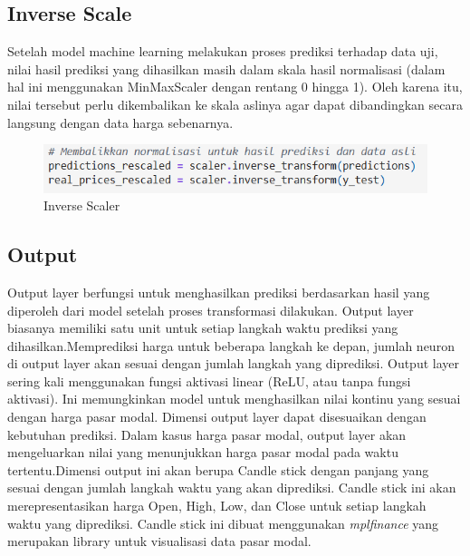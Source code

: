 



\subsection{Inverse Scale}
Setelah model machine learning melakukan proses prediksi terhadap data uji, nilai hasil prediksi yang dihasilkan masih dalam skala hasil normalisasi (dalam hal ini menggunakan MinMaxScaler dengan rentang 0 hingga 1). Oleh karena itu, nilai tersebut perlu dikembalikan ke skala aslinya agar dapat dibandingkan secara langsung dengan data harga sebenarnya.

\begin{figure} [H] \centering
    \includegraphics[scale=1.0]{gambar/inverse scaler.png} 
    \caption{Inverse Scaler}
    \label{fig:InverseScaler}
\end{figure}


\subsection{Output}
Output layer berfungsi untuk menghasilkan prediksi berdasarkan hasil yang diperoleh dari model setelah proses transformasi dilakukan. Output layer biasanya memiliki satu unit untuk setiap langkah waktu prediksi yang dihasilkan.Memprediksi harga untuk beberapa langkah ke depan, jumlah neuron di output layer akan sesuai dengan jumlah langkah yang diprediksi. Output layer sering kali menggunakan fungsi aktivasi linear (ReLU, atau tanpa fungsi aktivasi). Ini memungkinkan model untuk menghasilkan nilai kontinu yang sesuai dengan harga pasar modal. Dimensi output layer dapat disesuaikan dengan kebutuhan prediksi. Dalam kasus harga pasar modal, output layer akan mengeluarkan nilai yang menunjukkan harga pasar modal pada waktu tertentu.Dimensi output ini akan berupa Candle stick dengan panjang yang sesuai dengan jumlah langkah waktu yang akan diprediksi. Candle stick ini akan merepresentasikan harga Open, High, Low, dan Close untuk setiap langkah waktu yang diprediksi. Candle stick ini dibuat menggunakan \textit{mplfinance} yang merupakan library untuk visualisasi data pasar modal.

